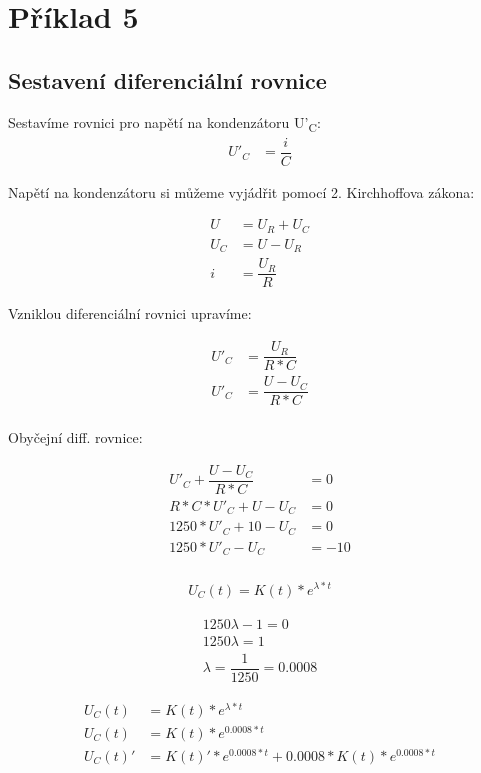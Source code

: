 \section{Příklad 5}

\subsection{Sestavení diferenciální rovnice}

Sestavíme rovnici pro napětí na kondenzátoru U'\textsubscript{C}:
\begin{align*}
	U'_C &= \dfrac{i}{C}
\end{align*}


Napětí na kondenzátoru si můžeme vyjádřit pomocí 2. Kirchhoffova zákona:

\begin{align*}
	U &= U_R + U_C\\
	U_C &= U-U_R\\
	i &= \dfrac{U_R}{R}
\end{align*}


Vzniklou diferenciální rovnici upravíme:

\begin{align*}
	U'_C &= \dfrac{U_R}{R * C} \\
	U'_C &= \dfrac{U - U_C}{R*C} \\
\end{align*}

Obyčejní diff. rovnice: 

\begin{align*}
	U'_C + \dfrac{U - U_C}{R*C}  &= 0 \\
	R*C*U'_C + U - U_C &= 0 \\
	1250 * U'_C + 10 - U_C &= 0 \\
	1250 * U'_C - U_C &= -10 \\
\end{align*}

\begin{align*}
	U_C(t)=K(t) * e^{\lambda * t}
\end{align*}


\begin{align*}
	1250\lambda - 1 = 0 \\
	1250\lambda  = 1 \\
	\lambda = \dfrac{1}{1250} = 0.0008
\end{align*}


\begin{align*}
	U_C(t) &= K(t) * e^{\lambda * t}\\
	U_C(t) &= K(t) * e^{0.0008 * t}\\
	U_C(t)' &= K(t)' * e^{0.0008 * t} + 0.0008 * K(t) * e^{0.0008 * t}\\
\end{align*}

